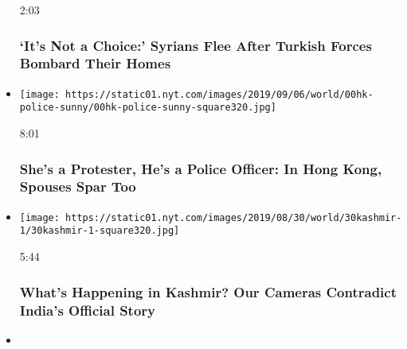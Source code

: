 \begin{itemize}
  2:03

  \hypertarget{its-not-a-choice-syrians-flee-after-turkish-forces-bombard-their-homes}{%
  \subsubsection{`It's Not a Choice:' Syrians Flee After Turkish Forces
  Bombard Their
  Homes}\label{its-not-a-choice-syrians-flee-after-turkish-forces-bombard-their-homes}}
\item
  \href{https://www.nytimes.com/video/world/asia/100000006682566/shes-a-protester-hes-a-police-officer-in-hong-kong-spouses-spar-too.html?action=click\&module=video-series-bar\&region=header\&pgtype=Article\&playlistId=video/on-the-ground}{}

  \texttt{[image: https://static01.nyt.com/images/2019/09/06/world/00hk-police-sunny/00hk-police-sunny-square320.jpg]}

  8:01

  \hypertarget{shes-a-protester-hes-a-police-officer-in-hong-kong-spouses-spar-too}{%
  \subsubsection{She's a Protester, He's a Police Officer: In Hong Kong,
  Spouses Spar
  Too}\label{shes-a-protester-hes-a-police-officer-in-hong-kong-spouses-spar-too}}
\item
  \href{https://www.nytimes.com/video/world/asia/100000006676350/kashmir-india-article370.html?action=click\&module=video-series-bar\&region=header\&pgtype=Article\&playlistId=video/on-the-ground}{}

  \texttt{[image: https://static01.nyt.com/images/2019/08/30/world/30kashmir-1/30kashmir-1-square320.jpg]}

  5:44

  \hypertarget{whats-happening-in-kashmir-our-cameras-contradict-indias-official-story}{%
  \subsubsection{What's Happening in Kashmir? Our Cameras Contradict
  India's Official
  Story}\label{whats-happening-in-kashmir-our-cameras-contradict-indias-official-story}}
\item
  \href{https://www.nytimes.com/video/world/asia/100000006664889/we-may-die-we-may-be-jailed-on-the-frontlines-with-hong-kongs-protesters.html?action=click\&module=video-series-bar\&region=header\&pgtype=Article\&playlistId=video/on-the-ground}{}


\end{itemize}
